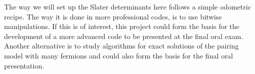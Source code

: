 \documentclass[prc]{revtex4}
\begin{document}
The way we will set up the Slater determinants here follows a simple odometric recipe. The way it is done in more professional codes, is to use bitwise manipulations. If this is of interest, this project could form the basis for the development of a more advanced code
to be presented at the final oral exam. Another alternative is to study algorithms for exact solutions of the pairing model with many fermions and could also form the basis for the final oral presentation.  
\end{document}
